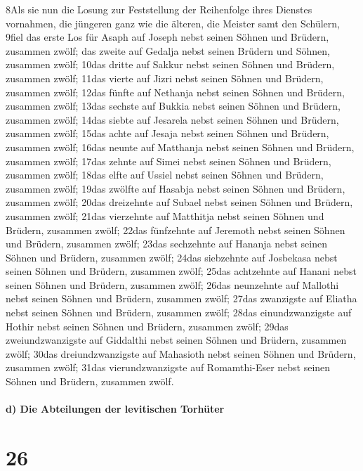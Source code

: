 8Als sie nun die Losung zur Feststellung der Reihenfolge ihres Dienstes
vornahmen, die jüngeren ganz wie die älteren, die Meister samt den
Schülern, 9fiel das erste Los für Asaph auf Joseph nebst seinen Söhnen
und Brüdern, zusammen zwölf; das zweite auf Gedalja nebst seinen Brüdern
und Söhnen, zusammen zwölf; 10das dritte auf Sakkur nebst seinen Söhnen
und Brüdern, zusammen zwölf; 11das vierte auf Jizri nebst seinen Söhnen
und Brüdern, zusammen zwölf; 12das fünfte auf Nethanja nebst seinen
Söhnen und Brüdern, zusammen zwölf; 13das sechste auf Bukkia nebst
seinen Söhnen und Brüdern, zusammen zwölf; 14das siebte auf Jesarela
nebst seinen Söhnen und Brüdern, zusammen zwölf; 15das achte auf Jesaja
nebst seinen Söhnen und Brüdern, zusammen zwölf; 16das neunte auf
Matthanja nebst seinen Söhnen und Brüdern, zusammen zwölf; 17das zehnte
auf Simei nebst seinen Söhnen und Brüdern, zusammen zwölf; 18das elfte
auf Ussiel nebst seinen Söhnen und Brüdern, zusammen zwölf; 19das
zwölfte auf Hasabja nebst seinen Söhnen und Brüdern, zusammen zwölf;
20das dreizehnte auf Subael nebst seinen Söhnen und Brüdern, zusammen
zwölf; 21das vierzehnte auf Matthitja nebst seinen Söhnen und Brüdern,
zusammen zwölf; 22das fünfzehnte auf Jeremoth nebst seinen Söhnen und
Brüdern, zusammen zwölf; 23das sechzehnte auf Hananja nebst seinen
Söhnen und Brüdern, zusammen zwölf; 24das siebzehnte auf Josbekasa nebst
seinen Söhnen und Brüdern, zusammen zwölf; 25das achtzehnte auf Hanani
nebst seinen Söhnen und Brüdern, zusammen zwölf; 26das neunzehnte auf
Mallothi nebst seinen Söhnen und Brüdern, zusammen zwölf; 27das
zwanzigste auf Eliatha nebst seinen Söhnen und Brüdern, zusammen zwölf;
28das einundzwanzigste auf Hothir nebst seinen Söhnen und Brüdern,
zusammen zwölf; 29das zweiundzwanzigste auf Giddalthi nebst seinen
Söhnen und Brüdern, zusammen zwölf; 30das dreiundzwanzigste auf
Mahasioth nebst seinen Söhnen und Brüdern, zusammen zwölf; 31das
vierundzwanzigste auf Romamthi-Eser nebst seinen Söhnen und Brüdern,
zusammen zwölf.

\hypertarget{d-die-abteilungen-der-levitischen-torhuxfcter}{%
\paragraph{d) Die Abteilungen der levitischen
Torhüter}\label{d-die-abteilungen-der-levitischen-torhuxfcter}}

\hypertarget{section-25}{%
\section{26}\label{section-25}}

